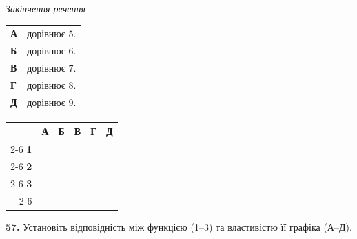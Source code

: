 \documentclass[14pt]{extarticle}
\begin{document}
\noindent
\begin{minipage}[t]{0.55\textwidth}
    \textit{Закінчення речення} \par \vspace{0.2cm}
    \begin{tabular}{ll}
    \textbf{А} & дорівнює $5$. \\
    \textbf{Б} & дорівнює $6$. \\
    \textbf{В} & дорівнює $7$. \\
    \textbf{Г} & дорівнює $8$. \\
    \textbf{Д} & дорівнює $9$. \\
    \end{tabular}
\end{minipage}%
\hfill
\begin{minipage}[t]{0.40\textwidth}
    \vspace{0.5cm}
    \begin{flushright}
    \begingroup
    \setlength{\tabcolsep}{4pt}
    \renewcommand{\arraystretch}{1.2}
    \small
    \begin{tabular}{r|c|c|c|c|c|}
         \multicolumn{1}{c}{} & \multicolumn{1}{c}{\textbf{А}} & \multicolumn{1}{c}{\textbf{Б}} & \multicolumn{1}{c}{\textbf{В}} & \multicolumn{1}{c}{\textbf{Г}} & \multicolumn{1}{c}{\textbf{Д}} \\ \cline{2-6}
         \textbf{1} & & & & & \\ \cline{2-6}
         \textbf{2} & & & & & \\ \cline{2-6}
         \textbf{3} & & & & & \\ \cline{2-6}
    \end{tabular}
    \endgroup
    \end{flushright}
\end{minipage}

\vspace{0.7cm}

\noindent\textbf{57.} Установіть відповідність між функцією (1--3) та властивістю її графіка (А--Д).

\vspace{0.3cm}
\end{document}
